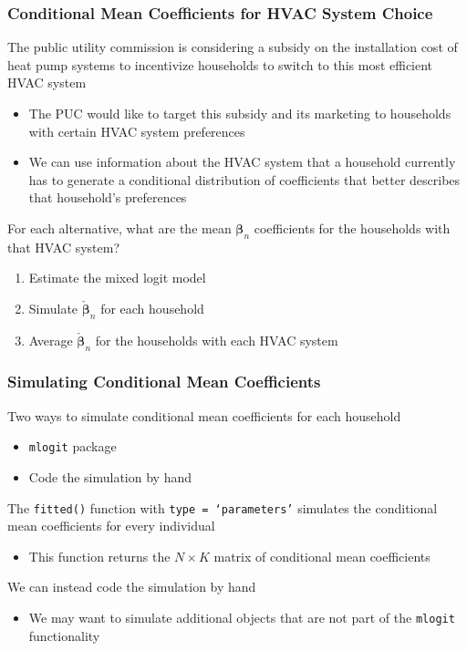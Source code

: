 \documentclass{beamer}\usepackage[]{graphicx}\usepackage[]{color}
\begin{document}
\begin{frame}\frametitle{Conditional Mean Coefficients for HVAC System Choice}
    The public utility commission is considering a subsidy on the installation cost of heat pump systems to incentivize households to switch to this most efficient HVAC system
    \begin{itemize}
        \item The PUC would like to target this subsidy and its marketing to households with certain HVAC system preferences
        \item We can use information about the HVAC system that a household currently has to generate a conditional distribution of coefficients that better describes that household's preferences
    \end{itemize}
    \vspace{2ex}
    For each alternative, what are the mean $\bm{\beta}_n$ coefficients for the households with that HVAC system?
    \begin{enumerate}
        \item Estimate the mixed logit model
        \item Simulate $\check{\bm{\beta}}_n$ for each household
        \item Average $\check{\bm{\beta}}_n$ for the households with each HVAC system
    \end{enumerate}
\end{frame}

\begin{frame}\frametitle{Simulating Conditional Mean Coefficients}
    Two ways to simulate conditional mean coefficients for each household
    \begin{itemize}
        \item \texttt{mlogit} package
        \item Code the simulation by hand
    \end{itemize}
    \vspace{3ex}
    The \texttt{fitted()} function with \texttt{type = `parameters'} simulates the conditional mean coefficients for every individual
    \begin{itemize}
        \item This function returns the $N \times K$ matrix of conditional mean coefficients
    \end{itemize}
    \vspace{3ex}
    We can instead code the simulation by hand
    \begin{itemize}
        \item We may want to simulate additional objects that are not part of the \texttt{mlogit} functionality
    \end{itemize}
\end{frame}
\end{document}
